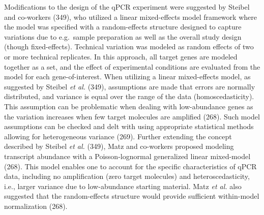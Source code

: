 \documentclass[twoside,10pt]{gihclass} %
\begin{document}
Modifications to the design of the qPCR experiment were suggested by Steibel and co-workers (349), who utilized a linear mixed-effects model framework where the model was specified with a random-effects structure designed to capture variations due to e.g.~sample preparation as well as the overall study design (though fixed-effects).
Technical variation was modeled as random effects of two or more technical replicates.
In this approach, all target genes are modeled together as a set, and the effect of experimental conditions are evaluated from the model for each gene-of-interest.
When utilizing a linear mixed-effects model, as suggested by Steibel \emph{et al.} (349), assumptions are made that errors are normally distributed, and variance is equal over the range of the data (homoscedasticity).
This assumption can be problematic when dealing with low-abundance genes as the variation increases when few target molecules are amplified (268).
Such model assumptions can be checked and delt with using appropriate statistical methods allowing for heterogeneous variance (269).
Further extending the concept described by Steibel \emph{et al.} (349), Matz and co-workers proposed modeling transcript abundance with a Poisson-lognormal generalized linear mixed-model (268). This model enables one to account for the specific characteristics of qPCR data, including no amplification (zero target molecules) and heteroscedasticity, i.e., larger variance due to low-abundance starting material.
Matz \emph{et al.} also suggested that the random-effects structure would provide sufficient within-model normalization (268).
\end{document}
